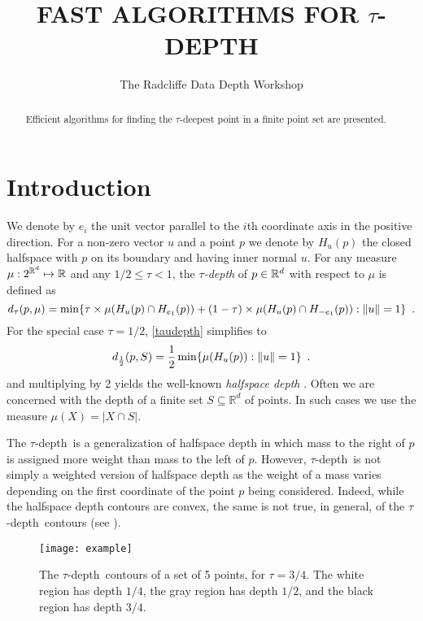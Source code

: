 \documentclass[lotsofwhite]{patmorin}
\title{\MakeUppercase{Fast Algorithms for $\tau$-Depth}}
\author{The Radcliffe Data Depth Workshop}
\date{}
\newcommand{\taudepth}{$\tau$-depth}
\newcommand{\Taudepth}{The $\tau$-depth}
\newcommand{\tdepth}{d_\tau}
\newcommand{\tukdepth}{d_{\frac{1}{2}}}
\begin{document}
\maketitle
\begin{abstract}
Efficient algorithms for finding the $\tau$-deepest point
in a finite point set are presented.
\end{abstract}

\section{Introduction}

We denote by $e_i$ the unit vector parallel to the $i$th coordinate
axis in the positive direction.  For a non-zero vector $u$ and a point
$p$ we denote by $H_u(p)$ the closed halfspace with $p$ on its
boundary and having inner normal $u$.  For any measure
$\mu:2^{\mathbb{R}^d}\mapsto\mathbb{R}$ and any $1/2\le\tau < 1$, the \emph{\taudepth}
of $p\in\mathbb{R}^d$ with respect to $\mu$ is defined as 
\begin{equation}
    \tdepth(p,\mu) = \min\{ \tau \times \mu(H_u(p)\cap H_{e_1}(p)) 
           + (1-\tau)\times \mu(H_u(p)\cap H_{-e_1}(p)): \|u\|=1\} \enspace .
    \eqlabel{taudepth}
\end{equation}
For the special case $\tau=1/2$, \eqref{taudepth} simplifies to
\begin{equation}
    \tukdepth(p,S) = \frac{1}{2}\min\{ \mu(H_u(p)) : \|u\|=1\} \enspace .
    \eqlabel{tukdepth}
\end{equation}
and multiplying by 2 yields the well-known \emph{halfspace depth}
\cite{tukey}.
Often we are concerned with the depth of a finite set
$S\subseteq\mathbb{R}^d$ of points.  In such cases we use the measure
$\mu(X)=|X\cap S|$.

\Taudepth\ is a generalization of halfspace depth in which mass to the
right of $p$ is assigned more weight than mass to the left of $p$.
However, \taudepth\ is not simply a weighted version of halfspace
depth as the weight of a mass varies depending on the first coordinate
of the point $p$ being considered.  Indeed, while the halfspace depth
contours are convex, the same is not true, in general, of the
\taudepth\ contours (see ).

\begin{figure}
\begin{center} \texttt{[image: example]} \end{center}
\caption{The \taudepth\ contours of a set of 5 points, for $\tau=3/4$. The
white region has depth $1/4$, the gray region has depth $1/2$, and the
black region has depth $3/4$.}
\end{figure}
\end{document}
